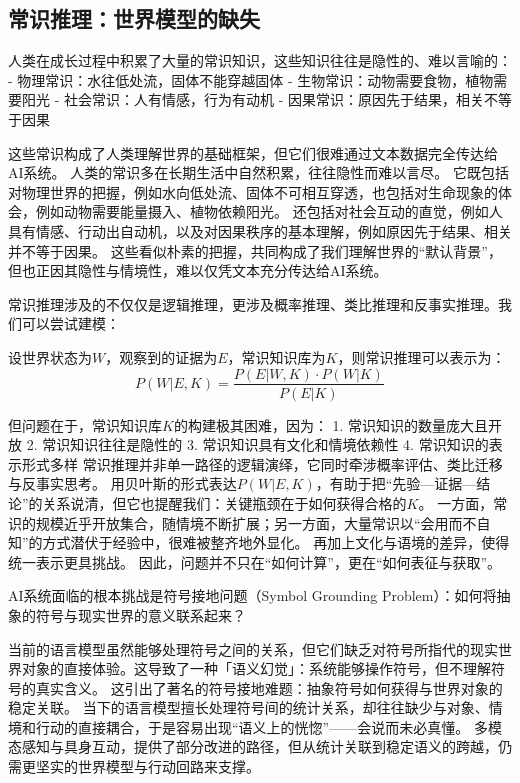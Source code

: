 \subsection{常识推理：世界模型的缺失}

人类在成长过程中积累了大量的常识知识，这些知识往往是隐性的、难以言喻的：
- 物理常识：水往低处流，固体不能穿越固体
- 生物常识：动物需要食物，植物需要阳光
- 社会常识：人有情感，行为有动机
- 因果常识：原因先于结果，相关不等于因果

这些常识构成了人类理解世界的基础框架，但它们很难通过文本数据完全传达给AI系统。
人类的常识多在长期生活中自然积累，往往隐性而难以言尽。
它既包括对物理世界的把握，例如水向低处流、固体不可相互穿透，也包括对生命现象的体会，例如动物需要能量摄入、植物依赖阳光。
还包括对社会互动的直觉，例如人具有情感、行动出自动机，以及对因果秩序的基本理解，例如原因先于结果、相关并不等于因果。
这些看似朴素的把握，共同构成了我们理解世界的“默认背景”，但也正因其隐性与情境性，难以仅凭文本充分传达给AI系统。

常识推理涉及的不仅仅是逻辑推理，更涉及概率推理、类比推理和反事实推理。我们可以尝试建模：

设世界状态为$W$，观察到的证据为$E$，常识知识库为$K$，则常识推理可以表示为：
\begin{equation}
P(W|E, K) = \frac{P(E|W, K) \cdot P(W|K)}{P(E|K)}
\end{equation}

但问题在于，常识知识库$K$的构建极其困难，因为：
1. 常识知识的数量庞大且开放
2. 常识知识往往是隐性的
3. 常识知识具有文化和情境依赖性
4. 常识知识的表示形式多样
常识推理并非单一路径的逻辑演绎，它同时牵涉概率评估、类比迁移与反事实思考。
用贝叶斯的形式表达$P(W|E,K)$，有助于把“先验—证据—结论”的关系说清，但它也提醒我们：关键瓶颈在于如何获得合格的$K$。
一方面，常识的规模近乎开放集合，随情境不断扩展；另一方面，大量常识以“会用而不自知”的方式潜伏于经验中，很难被整齐地外显化。
再加上文化与语境的差异，使得统一表示更具挑战。
因此，问题并不只在“如何计算”，更在“如何表征与获取”。

AI系统面临的根本挑战是符号接地问题（Symbol Grounding Problem）：如何将抽象的符号与现实世界的意义联系起来？

当前的语言模型虽然能够处理符号之间的关系，但它们缺乏对符号所指代的现实世界对象的直接体验。这导致了一种「语义幻觉」：系统能够操作符号，但不理解符号的真实含义。
这引出了著名的符号接地难题：抽象符号如何获得与世界对象的稳定关联。
当下的语言模型擅长处理符号间的统计关系，却往往缺少与对象、情境和行动的直接耦合，于是容易出现“语义上的恍惚”——会说而未必真懂。
多模态感知与具身互动，提供了部分改进的路径，但从统计关联到稳定语义的跨越，仍需更坚实的世界模型与行动回路来支撑。

